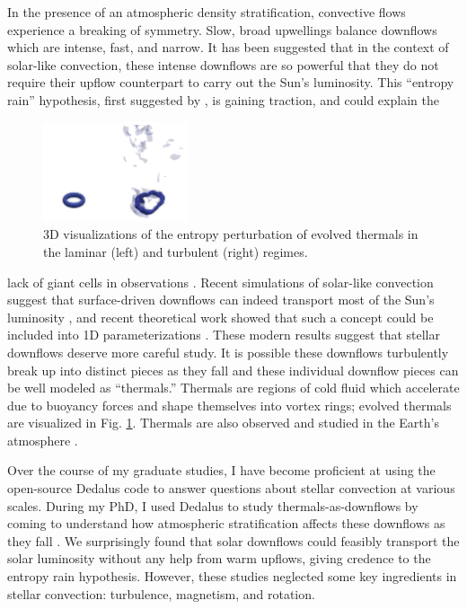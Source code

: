 \documentclass[11pt, preprint]{aastex}
\begin{document}
In the presence of an atmospheric density stratification, convective flows experience a breaking of symmetry.
Slow, broad upwellings balance downflows which are intense, fast, and narrow.
It has been suggested that in the context of solar-like convection, these intense downflows are so powerful that they do not require their upflow counterpart to carry out the Sun's luminosity.
This ``entropy rain'' hypothesis, first suggested by \citet{spruit1997}, is gaining traction, and could explain the
\begin{figure}
	\begin{center}
	\vspace{-10pt}
    \includegraphics[width=0.38\textwidth]{./figs/thermals_comparison.png}
	\vspace{-16pt}
	\end{center}
    \caption{
	3D visualizations of the entropy perturbation of evolved thermals in the laminar (left) and turbulent (right) regimes.
	\label{fig:thermals_comparison} }
	\vspace{-11pt}
\end{figure}
lack of giant cells in observations \citep{hanasoge&all2015}.
Recent simulations of solar-like convection suggest that surface-driven downflows can indeed transport most of the Sun's luminosity \citep{kapyla&all2017}, and recent theoretical work showed that such a concept could be included into 1D parameterizations \citep{brandenburg2016}.
These modern results suggest that stellar downflows deserve more careful study.
It is possible these downflows turbulently break up into distinct pieces as they fall and these individual downflow pieces can be well modeled as ``thermals.''
Thermals are regions of cold fluid which accelerate due to buoyancy forces and shape themselves into vortex rings; evolved thermals are visualized in Fig. \ref{fig:thermals_comparison}.
Thermals are also observed and studied in the Earth's atmosphere \citep{lecoanet&jeevanjee2019}.

Over the course of my graduate studies, I have become proficient at using the open-source Dedalus \citep{burns&all2019} code to answer questions about stellar convection at various scales.
During my PhD, I used Dedalus to study thermals-as-downflows by coming to understand how atmospheric stratification affects these downflows as they fall \citep{andersLB2019}.
We surprisingly found that solar downflows could feasibly transport the solar luminosity without any help from warm upflows, giving credence to the entropy rain hypothesis.
However, these studies neglected some key ingredients in stellar convection: turbulence, magnetism, and rotation.
\end{document}
